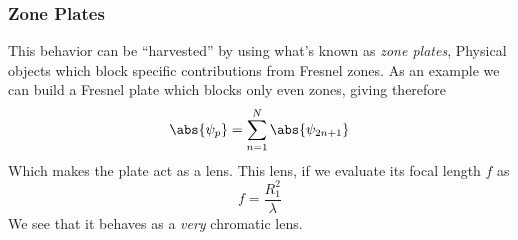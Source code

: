 \documentclass[../electromagnetism.tex]{subfiles}
\begin{document}
\subsubsection{Zone Plates}
This behavior can be ``harvested'' by using what's known as \textit{zone plates}, Physical objects which block specific contributions from Fresnel zones. As an example we can build a Fresnel plate which blocks only even zones, giving therefore
\begin{equation}
	\abs{\psi_p}=\sum_{n=1}^N\abs{\psi_{2n+1}}
	\label{eq:zoneplatelens.diff}
\end{equation}
Which makes the plate act as a lens. This lens, if we evaluate its focal length $f$ as 
\begin{equation*}
	f=\frac{R_1^2}{\lambda}
\end{equation*}
We see that it behaves as a \emph{very} chromatic lens.
\end{document}
